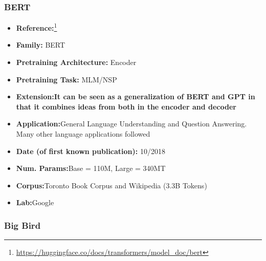 \documentclass{article}
\begin{document}
\subsubsection{BERT}

            \begin{itemize}
                \item \textbf{Reference:}\footnote{\url{https://huggingface.co/docs/transformers/model_doc/bert}}\cite{devlin2018bert}
                \item \textbf{Family:} BERT 
                \item \textbf{Pretraining Architecture:} Encoder
                \item \textbf{Pretraining Task:} MLM/NSP
                \item \textbf{Extension:It can be seen as a generalization of BERT and GPT in that it combines ideas from both in the encoder and decoder}   
                \item \textbf{Application:}General Language Understanding and Question Answering. Many other language applications followed
                \item \textbf{Date (of first known publication):} 10/2018
                \item \textbf{Num. Params:}Base = 110M, Large = 340MT
                \item \textbf{Corpus:}Toronto Book Corpus and Wikipedia (3.3B Tokens)
                \item \textbf{Lab:}Google
            \end{itemize}

\subsubsection{Big Bird}
\end{document}
